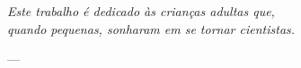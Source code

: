 \documentclass[
	12pt,				%
	openright,			%
	oneside,
	a4paper,			%
	sumario=abnt-6027-2012,
	english,			%
	brazil				%
	]{abntex2-ufpe-cin}
\begin{document}

\frenchspacing 





\setcounter{page}{1}





%



%     


%
%




\begin{dedicatoria}
   \vspace*{\fill}
   \centering
   \noindent
   \textit{ Este trabalho é dedicado às crianças adultas que,\\
   quando pequenas, sonharam em se tornar cientistas.} \vspace*{\fill}
\end{dedicatoria}
 ---
\end{document}
